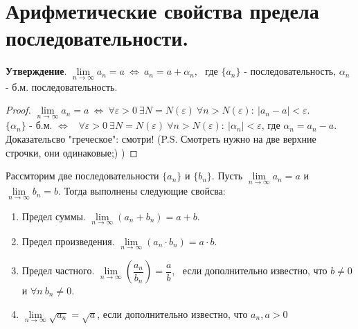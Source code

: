 \documentclass[12pt]{article}
\begin{document}
\section{Арифметические свойства предела последовательности.}
\textbf{Утверждение}. $\lim\limits_{n \to \infty} a_n  = a \ \Leftrightarrow \ a_n = a + \alpha_n$, \ где $\{a_n\}$ - последовательность, $\alpha_n$ - б.м. последовательность. 
\begin{proof}
    $\lim\limits_{n \to \infty} a_n  = a \ \Leftrightarrow \ \forall \varepsilon > 0 \ \exists N = N(\varepsilon) \ \forall n > N(\varepsilon): \ |a_n - a| < \varepsilon$. \\
    $\{\alpha_n\}$ - б.м. $\Leftrightarrow$ \ $\forall \varepsilon > 0 \ \exists N = N(\varepsilon) \ \forall n > N(\varepsilon): \ |\alpha_n| < \varepsilon$, где $\alpha_n = a_n - a$. \\
    Доказательсво "греческое": смотри! (P.S. Смотреть нужно на две верхние строчки, они одинаковые;) )
\end{proof}
Рассмторим две последовательности $\{a_n\}$ и $\{b_n\}$. Пусть $\lim\limits_{n \to \infty} a_n = a$ и $\lim\limits_{n \to \infty} b_n = b$. Тогда выполнены следующие свойсва: 
\begin{enumerate}[itemsep=0mm, topsep=0mm, partopsep=0mm]
    \item Предел суммы. $\lim\limits_{n \to \infty} (a_n + b_n) = a + b$.
    \item Предел произведения. $\lim\limits_{n \to \infty} (a_n \cdot b_n) = a \cdot b$.
    \item Предел частного. $\lim\limits_{n \to \infty} \left(\dfrac{a_n}{b_n}\right) = \dfrac{a}{b}$, \ если дополнительно известно, что $b \neq 0$ и $\forall n \ b_n \neq 0$.
    \item $\lim\limits_{n\to\infty}\sqrt{a_n} = \sqrt{a}$, если дополнительно известно, что $a_n, a > 0$
\end{enumerate}
\end{document}
